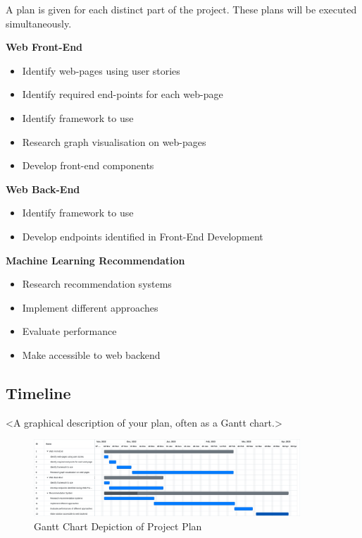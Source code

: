 A plan is given for each distinct part of the project. These plans will be executed simultaneously.


\textbf{Web Front-End}
\begin{itemize}
    \item Identify web-pages using user stories
    \item Identify required end-points for each web-page
    \item Identify framework to use
    \item Research graph visualisation on web-pages
    \item Develop front-end components
\end{itemize}
\textbf{Web Back-End}
\begin{itemize}
    \item Identify framework to use
    \item Develop endpoints identified in Front-End Development
\end{itemize}
\textbf{Machine Learning Recommendation}
\begin{itemize}
    \item Research recommendation systems
    \item Implement different approaches
    \item Evaluate performance
    \item Make accessible to web backend
\end{itemize}

\subsection{Timeline}

<A graphical description of your plan, often as a Gantt chart.>

\begin{figure}[htbp]	
	\centerline{
		\includegraphics[width=10cm]{../PlanGantt.png}
	}
	\caption{Gantt Chart Depiction of Project Plan}
\end{figure}



